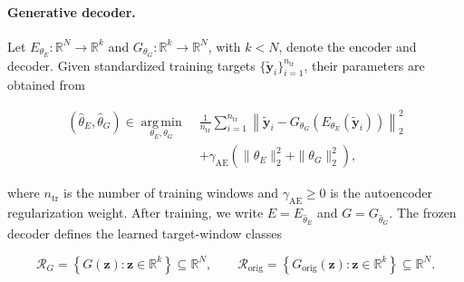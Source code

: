 \paragraph{Generative decoder.}
Let
$E_{\theta_E}:\mathbb{R}^{N}\rightarrow\mathbb{R}^{k}$ and
$G_{\theta_G}:\mathbb{R}^{k}\rightarrow\mathbb{R}^{N}$, with $k<N$, denote
the encoder and decoder. Given standardized training targets
$\{\widetilde{\boldsymbol{y}}_i\}_{i=1}^{n_{\mathrm{tr}}}$, their parameters
are obtained from

\begin{equation}
\begin{aligned}
(\widehat{\theta}_E,\widehat{\theta}_G)
\in
\operatorname*{arg\,min}_{\theta_E,\theta_G}
\;&
\frac{1}{n_{\mathrm{tr}}}
\sum_{i=1}^{n_{\mathrm{tr}}}
\left\|
\widetilde{\boldsymbol{y}}_i
-
G_{\theta_G}
\left(
E_{\theta_E}
\left(
\widetilde{\boldsymbol{y}}_i
\right)
\right)
\right\|_2^2
\\
&+
\gamma_{\mathrm{AE}}
\left(
\|\theta_E\|_2^2+\|\theta_G\|_2^2
\right),
\end{aligned}
\label{eq:autoencoder_training_objective}
\end{equation}

where $n_{\mathrm{tr}}$ is the number of training windows and
$\gamma_{\mathrm{AE}}\geq 0$ is the autoencoder regularization weight. After
training, we write $E=E_{\widehat{\theta}_E}$ and
$G=G_{\widehat{\theta}_G}$. The frozen decoder defines the learned
target-window classes

\begin{equation}
\mathcal{R}_{G}
=
\left\{
G(\boldsymbol{z}):
\boldsymbol{z}\in\mathbb{R}^{k}
\right\}
\subseteq
\mathbb{R}^{N},
\qquad
\mathcal{R}_{\mathrm{orig}}
=
\left\{
G_{\mathrm{orig}}(\boldsymbol{z}):
\boldsymbol{z}\in\mathbb{R}^{k}
\right\}
\subseteq
\mathbb{R}^{N}.
\label{eq:decoder_range}
\end{equation}

